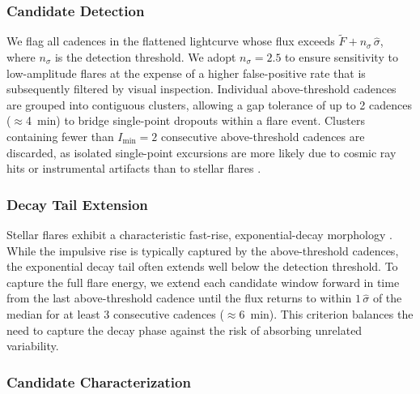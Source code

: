 \subsubsection{Candidate Detection}\label{sec:detection}

We flag all cadences in the flattened lightcurve whose flux exceeds
$\widetilde{F} + n_\sigma\,\hat{\sigma}$, where $n_\sigma$ is the
detection threshold.  We adopt $n_\sigma = 2.5$ to ensure sensitivity
to low-amplitude flares at the expense of a higher false-positive rate
that is subsequently filtered by visual inspection.  Individual
above-threshold cadences are grouped into contiguous clusters, allowing
a gap tolerance of up to 2 cadences ($\approx$4~min) to bridge
single-point dropouts within a flare event.  Clusters containing fewer
than $I_\mathrm{min} = 2$ consecutive above-threshold cadences are
discarded, as isolated single-point excursions are more likely due to
cosmic ray hits or instrumental artifacts than to stellar flares
\citep{Ilin2021}.

\subsubsection{Decay Tail Extension}\label{sec:decay_tail}

Stellar flares exhibit a characteristic fast-rise, exponential-decay
morphology \citep{Davenport2014}.  While the impulsive rise is
typically captured by the above-threshold cadences, the exponential
decay tail often extends well below the detection threshold.  To
capture the full flare energy, we extend each candidate window forward
in time from the last above-threshold cadence until the flux returns
to within $1\,\hat{\sigma}$ of the median for at least 3 consecutive
cadences ($\approx$6~min).  This criterion balances the need to
capture the decay phase against the risk of absorbing unrelated
variability.

\subsubsection{Candidate Characterization}

